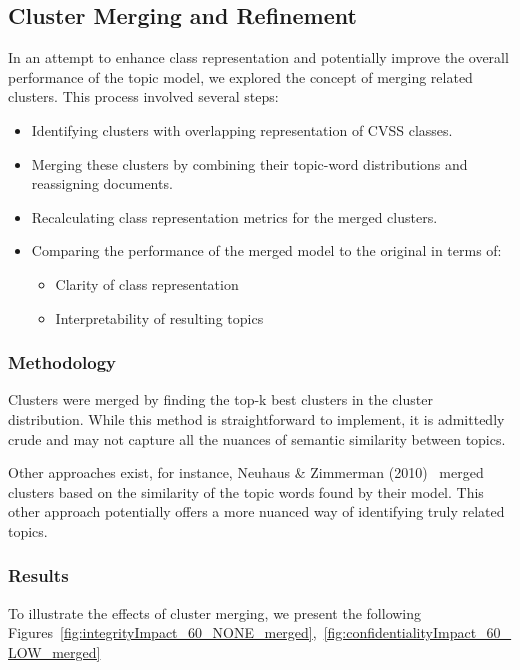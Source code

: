 \subsection{Cluster Merging and Refinement}

In an attempt to enhance class representation and potentially improve the overall performance of the topic model, we explored the concept of merging related clusters. This process involved several steps:

\begin{itemize}
	\item Identifying clusters with overlapping representation of CVSS classes.
	\item Merging these clusters by combining their topic-word distributions and reassigning documents.
	\item Recalculating class representation metrics for the merged clusters.
	\item Comparing the performance of the merged model to the original in terms of:
	      \begin{itemize}
		      \item Clarity of class representation
		      \item Interpretability of resulting topics
	      \end{itemize}
\end{itemize}

\subsubsection{Methodology}

Clusters were merged by finding the top-k best clusters in the cluster distribution. While this method is straightforward to implement, it is admittedly crude and may not capture all the nuances of semantic similarity between topics.

Other approaches exist, for instance, Neuhaus \& Zimmerman (2010)~\cite{cve_topic_modelling} merged clusters based on the similarity of the topic words found by their model. This other approach potentially offers a more nuanced way of identifying truly related topics.

\subsubsection{Results}

To illustrate the effects of cluster merging, we present the following Figures~\ref{fig:integrityImpact_60_NONE_merged},~\ref{fig:confidentialityImpact_60_LOW_merged}


